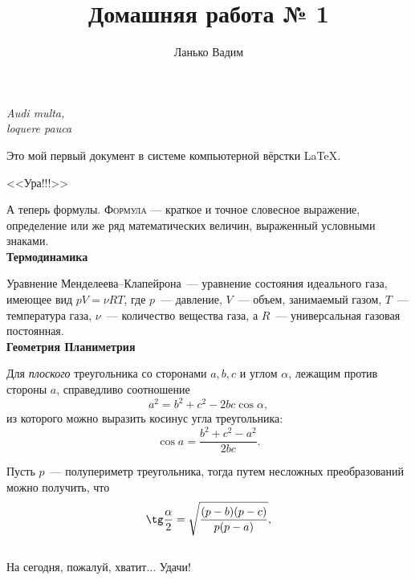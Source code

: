 \documentclass[12pt]{article}
\title{Домашняя работа № 1}
\author{Ланько Вадим}
\date{}
\begin{document}
	\maketitle
	\begin{flushright}\textit{Audi multa,\\
loquere pauca}\hspace{0pt}
\end{flushright}
\vspace{20pt}
\par{Это мой первый документ в системе компьютерной вёрстки \LaTeX.}
\begin{center}
\huge{\textsf{<<Ура!!!>>}}
\end{center}

А теперь формулы. \textsc{Формула} — краткое и точное словесное выражение, определение или же ряд математических величин, выраженный
условными знаками.
\vspace{15pt}\\
\hspace*{28pt}\textbf{\Large{Термодинамика}}

Уравнение Менделеева--Клапейрона~--- уравнение состояния идеального газа, имеющее вид $pV = \nu RT$, где $p$~--- давление, $V$~--- объем, занимаемый газом, $T$~--- температура газа, $\nu$~--- количество вещества газа, а
$R$~--- универсальная газовая постоянная.
\vspace{15pt}\\
\hspace*{28pt}\textbf{\Large{Геометрия} \hfill \Large{Планиметрия}}\hspace{0pt}

 Для \textsl{плоского} треугольника со сторонами $a, b, c$ и углом $\alpha$, лежащим
против стороны $a$, справедливо соотношение
\[a^2 = b^2 + c^2 - 2bc\cos \alpha,\]
из которого можно выразить косинус угла треугольника:
\[\cos a=\frac{b^2 + c^2 - a^2}{2bc}.\]
\newpage

Пусть $p$~--- полупериметр треугольника, тогда путем несложных преобразований можно получить, что
\[\tg \frac{\alpha}{2}=\sqrt{\frac{(p-b)(p-c)}{p(p-a)}},\]
\vspace*{1cm}\\
\hspace*{0pt}На сегодня, пожалуй, хватит$\ldots$ Удачи!
\end{document}
